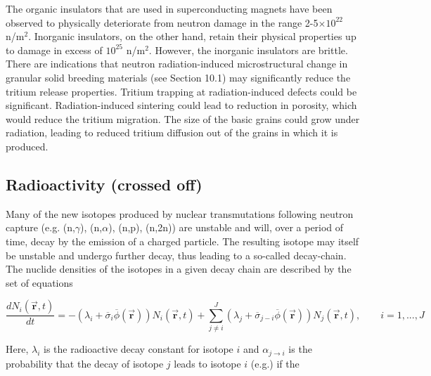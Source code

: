 \documentclass[11pt]{report} %
\begin{document}
The organic insulators that are used in superconducting magnets have been observed to physically deteriorate from neutron damage in the range 2-5$\times 10^{22}$ n/m$^2$. Inorganic insulators, on the other hand, retain their physical properties up to damage in excess of $10^{25}$ n/m$^2$. However, the inorganic insulators are brittle. There are indications that neutron radiation-induced microstructural change in granular solid breeding materials (see Section 10.1) may significantly reduce the tritium release properties. Tritium trapping at radiation-induced defects could be significant. Radiation-induced sintering could lead to reduction in porosity, which would reduce the tritium migration. The size of the basic grains could grow under radiation, leading to reduced tritium diffusion out of the grains in which it is produced.

\subsection{Radioactivity (crossed off)}
Many of the new isotopes produced by nuclear transmutations following neutron capture (e.g. (n,$\gamma$), (n,$\alpha$), (n,p), (n,2n)) are unstable and will, over a period of time, decay by the emission of a charged particle. The resulting isotope may itself be unstable and undergo further decay, thus leading to a so-called decay-chain. The nuclide densities of the isotopes in a given decay chain are described by the set of equations

\begin{equation}
  \frac{d N_i(\vec{\mathbf{r}},t)}{dt} = 
  - (\lambda_i + \overline{\sigma}_i \overline{\phi}(\vec{\mathbf{r}})) N_i(\vec{\mathbf{r}},t) +
  \sum_{j \ne i}^{J} (\lambda_j + \overline{\sigma}_{j-i} \overline{\phi}(\vec{\mathbf{r}})) N_j(\vec{\mathbf{r}},t),
  \qquad i=1,...,J
\end{equation}

Here, $\lambda_i$ is the radioactive decay constant for isotope $i$ and $\alpha_{j \rightarrow i}$ is the probability that the decay of isotope $j$ leads to isotope $i$ (e.g.) if the
\end{document}
